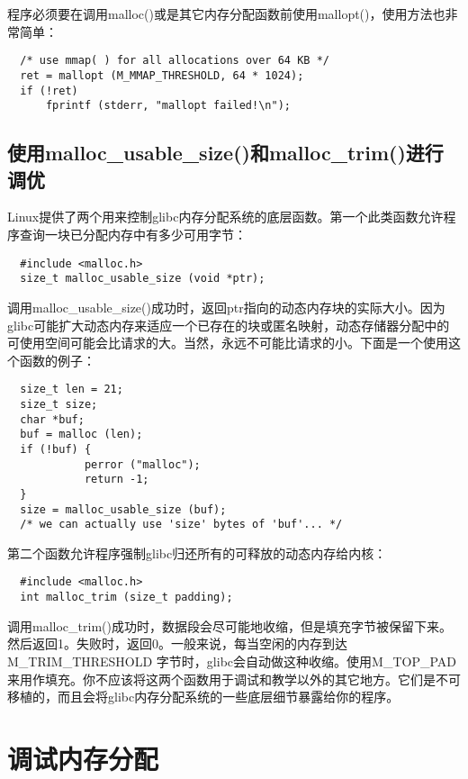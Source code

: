 程序必须要在调用malloc()或是其它内存分配函数前使用mallopt()，使用方法也非常简单： 

\begin{lstlisting}
  /* use mmap( ) for all allocations over 64 KB */
  ret = mallopt (M_MMAP_THRESHOLD, 64 * 1024);
  if (!ret)
      fprintf (stderr, "mallopt failed!\n");
\end{lstlisting}

\subsection{使用malloc\_usable\_size()和malloc\_trim()进行调优}

Linux提供了两个用来控制glibc内存分配系统的底层函数。第一个此类函数允许程序查询一块已分配内存中有多少可用字节： 

\begin{lstlisting}
  #include <malloc.h>
  size_t malloc_usable_size (void *ptr);
\end{lstlisting}

调用malloc\_usable\_size()成功时，返回ptr指向的动态内存块的实际大小。因为glibc可能扩大动态内存来适应一个已存在的块或匿名映射，动态存储器分配中的可使用空间可能会比请求的大。当然，永远不可能比请求的小。下面是一个使用这个函数的例子： 

\begin{lstlisting}
  size_t len = 21;
  size_t size;
  char *buf;
  buf = malloc (len);
  if (!buf) {
            perror ("malloc");
            return -1;
  }
  size = malloc_usable_size (buf);
  /* we can actually use 'size' bytes of 'buf'... */
\end{lstlisting}

第二个函数允许程序强制glibc归还所有的可释放的动态内存给内核： 

\begin{lstlisting}
  #include <malloc.h>
  int malloc_trim (size_t padding);
\end{lstlisting}

调用malloc\_trim()成功时，数据段会尽可能地收缩，但是填充字节被保留下来。然后返回1。失败时，返回0。一般来说，每当空闲的内存到达M\_TRIM\_THRESHOLD 字节时，glibc会自动做这种收缩。使用M\_TOP\_PAD来用作填充。你不应该将这两个函数用于调试和教学以外的其它地方。它们是不可移植的，而且会将glibc内存分配系统的一些底层细节暴露给你的程序。 

\section{调试内存分配}

